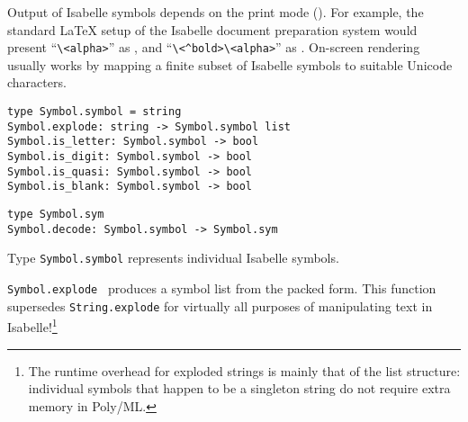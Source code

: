 \begin{isabellebody}
\begin{isamarkuptext}
  \medskip Output of Isabelle symbols depends on the print mode
  ().  For example, the standard {\LaTeX} setup of
  the Isabelle document preparation system would present
  ``\verb,\,\verb,<alpha>,'' as , and
  ``\verb,\,\verb,<^bold>,\verb,\,\verb,<alpha>,'' as .  On-screen rendering usually works by mapping a finite
  subset of Isabelle symbols to suitable Unicode characters.%
\end{isamarkuptext}%
\isamarkuptrue%
%
\isadelimmlref
%
\endisadelimmlref
%
\isatagmlref
%
\begin{isamarkuptext}%
\begin{mldecls}
  \verb|type Symbol.symbol = string| \\
  \verb|Symbol.explode: string -> Symbol.symbol list| \\
  \verb|Symbol.is_letter: Symbol.symbol -> bool| \\
  \verb|Symbol.is_digit: Symbol.symbol -> bool| \\
  \verb|Symbol.is_quasi: Symbol.symbol -> bool| \\
  \verb|Symbol.is_blank: Symbol.symbol -> bool| \\
  \end{mldecls}
  \begin{mldecls}
  \verb|type Symbol.sym| \\
  \verb|Symbol.decode: Symbol.symbol -> Symbol.sym| \\
  \end{mldecls}

  \begin{description}

  \item Type \verb|Symbol.symbol| represents individual Isabelle
  symbols.

  \item \verb|Symbol.explode|~ produces a symbol list
  from the packed form.  This function supersedes \verb|String.explode| for virtually all purposes of manipulating text in
  Isabelle!\footnote{The runtime overhead for exploded strings is
  mainly that of the list structure: individual symbols that happen to
  be a singleton string do not require extra memory in Poly/ML.}


\end{description}
\end{isamarkuptext}
\end{isabellebody}

